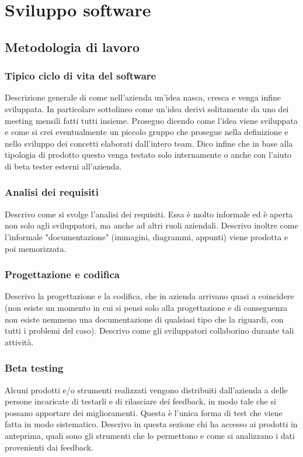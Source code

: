 	\section{Sviluppo software}
		\subsection{Metodologia di lavoro}
			\subsubsection{Tipico ciclo di vita del software}
				Descrizione generale di come nell'azienda un'idea nasca, cresca e venga infine sviluppata. In particolare sottolineo
				come un'idea derivi solitamente da uno dei meeting mensili fatti tutti insieme. Proseguo dicendo come l'idea viene
				sviluppata e come si crei eventualmente un piccolo gruppo che prosegue nella definizione e nello sviluppo dei
				concetti elaborati dall'intero team. Dico infine che in base alla tipologia di prodotto questo venga testato solo
				internamente o anche con l'aiuto di beta tester esterni all'azienda.
			\subsubsection{Analisi dei requisiti}
				Descrivo come si svolge l'analisi dei requisiti. Essa è molto informale ed è aperta non solo agli sviluppatori, ma
				anche ad altri ruoli aziendali. Descrivo inoltre come l'informale "documentazione" (immagini, diagrammi, appunti)
				viene prodotta e poi memorizzata.
			\subsubsection{Progettazione e codifica}
				Descrivo la progettazione e la codifica, che in azienda arrivano quasi a coincidere (non esiste un momento in cui
				si pensi solo alla progettazione e di conseguenza non esiste nemmeno una documentazione di qualsiasi tipo che la
				riguardi, con tutti i problemi del caso). Descrivo come gli sviluppatori collaborino durante tali attività.
			\subsubsection{Beta testing}
				Alcuni prodotti e/o strumenti realizzati vengono distribuiti dall'azienda a delle persone incaricate di testarli
				e di rilasciare dei feedback, in modo tale che si possano apportare dei miglioramenti. Questa è l'unica forma di
				test che viene fatta in modo sistematico. Descrivo in questa sezione chi ha accesso ai prodotti in anteprima, quali
				sono gli strumenti che lo permettono e come si analizzano i dati provenienti dai feedback.
